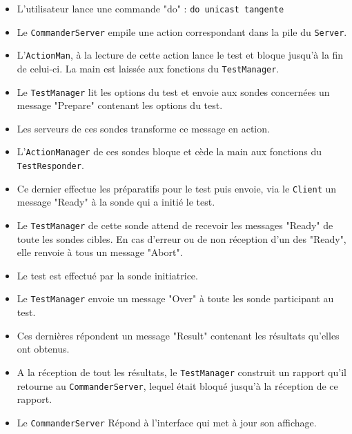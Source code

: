 \documentclass[a4paper,11pt]{article}
\begin{document}
\begin{itemize}
\item L'utilisateur lance une commande "do" : \texttt{do unicast tangente}
\item Le \texttt{CommanderServer} empile une action correspondant dans la pile du \texttt{Server}.
\item L'\texttt{ActionMan}, à la lecture de cette action lance le test et bloque jusqu'à la fin de celui-ci. La main est laissée aux fonctions du \texttt{TestManager}.
\item Le \texttt{TestManager} lit les options du test et envoie aux sondes concernées un message "Prepare" contenant les options du test.
\item Les serveurs de ces sondes transforme ce message en action.
\item L'\texttt{ActionManager} de ces sondes bloque et cède la main aux fonctions du \texttt{TestResponder}.
\item Ce dernier effectue les préparatifs pour le test puis envoie, via le \texttt{Client} un message "Ready" à la sonde qui a initié le test.
\item Le \texttt{TestManager} de cette sonde attend de recevoir les messages "Ready" de toute les sondes cibles. En cas d'erreur ou de non réception d'un des "Ready", elle renvoie à tous un message "Abort".
\item Le test est effectué par la sonde initiatrice.
\item Le \texttt{TestManager} envoie un message "Over" à toute les sonde participant au test.
\item Ces dernières répondent un message "Result" contenant les résultats qu'elles ont obtenus.
\item A la réception de tout les résultats, le \texttt{TestManager} construit un rapport qu'il retourne au \texttt{CommanderServer}, lequel était bloqué jusqu'à la réception de ce rapport.
\item Le \texttt{CommanderServer} Répond à l'interface qui met à jour son affichage.
\end{itemize}
\end{document}
